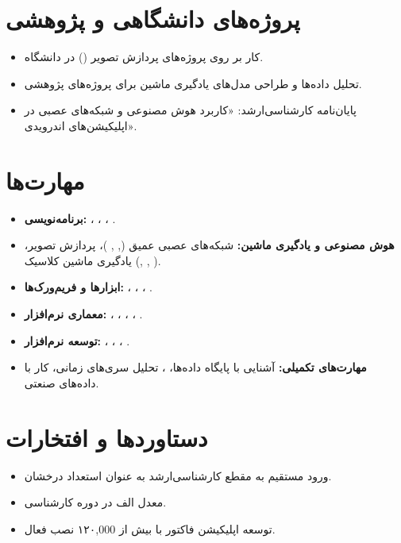 \section*{پروژه‌های دانشگاهی و پژوهشی}
\begin{itemize}
  \item کار بر روی پروژه‌های پردازش تصویر () در دانشگاه.
  \item تحلیل داده‌ها و طراحی مدل‌های یادگیری ماشین برای پروژه‌های پژوهشی.
  \item پایان‌نامه کارشناسی‌ارشد: «کاربرد هوش مصنوعی و شبکه‌های عصبی در اپلیکیشن‌های اندرویدی».
\end{itemize}

\section*{مهارت‌ها}
\begin{itemize}
  \item \textbf{برنامه‌نویسی:} ، ، ، .
  \item \textbf{هوش مصنوعی و یادگیری ماشین:} شبکه‌های عصبی عمیق (, , )، پردازش تصویر، یادگیری ماشین کلاسیک (, , ).
  \item \textbf{ابزارها و فریم‌ورک‌ها:} ، ، ، .
  \item \textbf{معماری نرم‌افزار:} ، ، ، ، .
  \item \textbf{توسعه نرم‌افزار:} ، ، ، .
  \item \textbf{مهارت‌های تکمیلی:} آشنایی با پایگاه داده‌ها، ، تحلیل سری‌های زمانی، کار با داده‌های صنعتی.
\end{itemize}

\section*{دستاوردها و افتخارات}
\begin{itemize}
  \item ورود مستقیم به مقطع کارشناسی‌ارشد به عنوان استعداد درخشان.
  \item معدل الف در دوره کارشناسی.
  \item توسعه اپلیکیشن فاکتور با بیش از ۱۲۰{,}000 نصب فعال.
\end{itemize}
